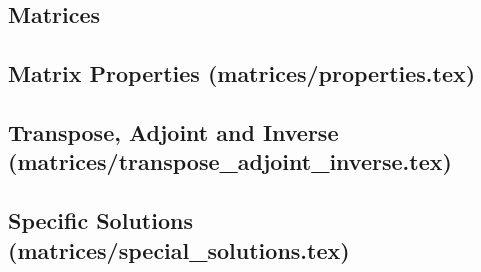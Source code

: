 \documentclass[\fontheight]{extarticle}
\begin{document}
\begin{multicols*}{3}


    \section{Matrices}
    \subsection{Matrix Properties (matrices/properties.tex)}
    
    \subsection{Transpose, Adjoint and Inverse (matrices/transpose\_adjoint\_inverse.tex)}
    
    \subsection{Specific Solutions (matrices/special\_solutions.tex)}
    

\end{multicols*}
\end{document}
